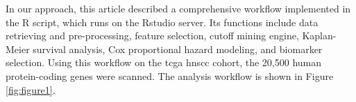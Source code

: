\documentclass[cancers,article,submit,moreauthors,pdftex]{Definitions/mdpi}
\begin{document}
In our approach, this article described a comprehensive workflow implemented in the R script, which runs on the Rstudio server. Its functions include data retrieving and pre-processing, feature selection, cutoff mining engine, Kaplan-Meier survival analysis, Cox proportional hazard modeling, and biomarker selection.
Using this workflow on the \acrshort{tcga} \acrshort{hnscc} cohort, the 20,500 human protein-coding genes were scanned. The analysis workflow is shown in Figure \ref{fig:figure1}.
\end{document}
